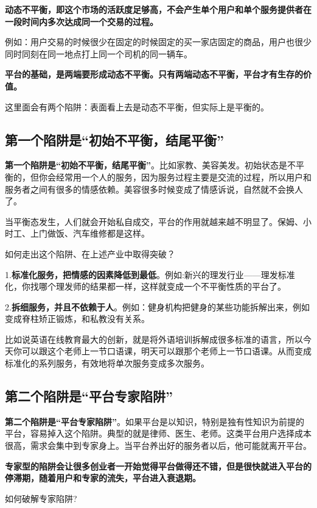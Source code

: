\documentclass[12pt]{article}
\begin{document}
\textbf{动态不平衡，即这个市场的活跃度足够高，不会产生单个用户和单个服务提供者在一段时间内多次达成同一个交易的过程。}

例如：用户交易的时候很少在固定的时候固定的买一家店固定的商品，用户也很少同时同刻在同一地点打上同一个司机的同一辆车。

\textbf{平台的基础，是两端要形成动态不平衡。只有两端动态不平衡，平台才有生存的价值。}

这里面会有两个陷阱：表面看上去是动态不平衡，但实际上是平衡的。

\subsection{第一个陷阱是“初始不平衡，结尾平衡”}

\textbf{第一个陷阱是“初始不平衡，结尾平衡”}。比如家教、美容美发。初始状态是不平衡的，但你会经常用一个人的服务，因为服务过程主要是交流的过程，所以用户和服务者之间有很多的情感依赖。美容很多时候变成了情感诉说，自然就不会换人了。

当平衡态发生，人们就会开始私自成交，平台的作用就越来越不明显了。保姆、小时工、上门做饭、汽车维修都是这样。

如何走出这个陷阱、在上述产业中取得突破？

1.\textbf{标准化服务，把情感的因素降低到最低}。例如:新兴的理发行业——理发标准化，你找哪个理发师的结果都一样，这样就变成一个不平衡性质的平台了。

2.\textbf{拆细服务，并且不依赖于人}。例如：健身机构把健身的某些功能拆解出来，例如变成脊柱矫正锻炼，和私教没有关系。

比如说英语在线教育最大的创新，就是将外语培训拆解成很多标准的语言，所以今天你可以跟这个老师上一节口语课，明天可以跟那个老师上一节口语课。从而变成标准化的系列服务，有效地将单次服务变成多次服务。

\subsection{第二个陷阱是“平台专家陷阱”}

\textbf{第二个陷阱是“平台专家陷阱”}。如果平台是以知识，特别是独有性知识为前提的平台，容易掉入这个陷阱。典型的就是律师、医生、老师。这类平台用户选择成本很高，需求会集中到专家身上。当平台养出好的服务者以后，他可能就离开平台。

\textbf{专家型的陷阱会让很多创业者一开始觉得平台做得还不错，但是很快就进入平台的停滞期，随着用户和专家的流失，平台进入衰退期。}

如何破解专家陷阱?
\end{document}
